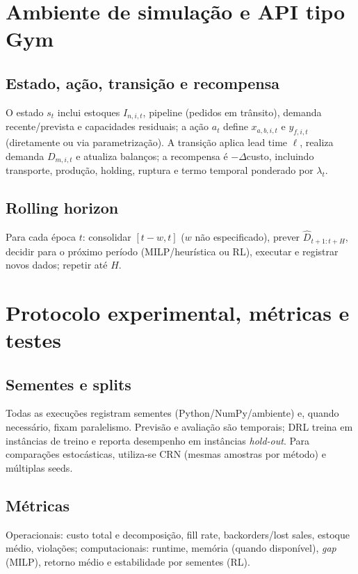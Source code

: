\section{Ambiente de simulação e API tipo Gym}
\subsection{Estado, ação, transição e recompensa}
O estado \(s_t\) inclui estoques \(I_{n,i,t}\), pipeline (pedidos em trânsito), demanda recente/prevista e capacidades residuais; a ação \(a_t\) define \(x_{a,b,i,t}\) e \(y_{f,i,t}\) (diretamente ou via parametrização). A transição aplica lead time \(\ell\), realiza demanda \(D_{m,i,t}\) e atualiza balanços; a recompensa é \(-\Delta\)custo, incluindo transporte, produção, holding, ruptura e termo temporal ponderado por \(\lambda_t\). \cite{Axsater2006InventoryControl,Boute2022DRLInventoryRoadmap}

\subsection{Rolling horizon}
Para cada época \(t\): consolidar \([t-w,t]\) (\(w\) não especificado), prever \(\hat{D}_{t+1:t+H}\), decidir para o próximo período (MILP/heurística ou RL), executar e registrar novos dados; repetir até \(H\). \cite{Law2015SimulationModeling}

\section{Protocolo experimental, métricas e testes}
\subsection{Sementes e splits}
Todas as execuções registram sementes (Python/NumPy/ambiente) e, quando necessário, fixam paralelismo. Previsão e avaliação são temporais; DRL treina em instâncias de treino e reporta desempenho em instâncias \emph{hold-out}. Para comparações estocásticas, utiliza-se CRN (mesmas amostras por método) e múltiplas seeds.

\subsection{Métricas}
Operacionais: custo total e decomposição, fill rate, backorders/lost sales, estoque médio, violações; computacionais: runtime, memória (quando disponível), \emph{gap} (MILP), retorno médio e estabilidade por sementes (RL). \cite{Axsater2006InventoryControl,Law2015SimulationModeling}

